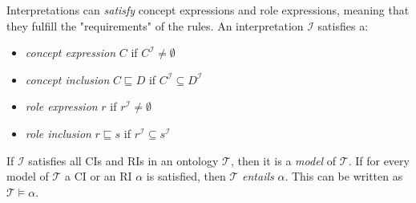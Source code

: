 Interpretations can \emph{satisfy} concept expressions and role expressions, meaning that they fulfill the "requirements" of the rules. An interpretation $\mathcal{I}$ satisfies a:
\begin{itemize}
    \item \emph{concept expression} $C$ if $C^{\mathcal{I}} \neq \emptyset$
    \item \emph{concept inclusion} $C \sqsubseteq D$ if $C^{\mathcal{I}} \subseteq D^{\mathcal{I}}$
    \item \emph{role expression} $r$ if $r^{\mathcal{I}} \neq \emptyset$
    \item \emph{role inclusion } $r \sqsubseteq s$ if $r^{\mathcal{I}}  \subseteq s^{\mathcal{I}}$
\end{itemize} 

If $\mathcal{I}$ satisfies all CIs and RIs in an ontology $\mathcal{T}$, then it is a \emph{model} of $\mathcal{T}$. If for every model of $\mathcal{T}$ a CI or an RI $\alpha$ is satisfied, then $\mathcal{T}$ \emph{entails} $\alpha$. This can be written as $\mathcal{T} \models \alpha$.
